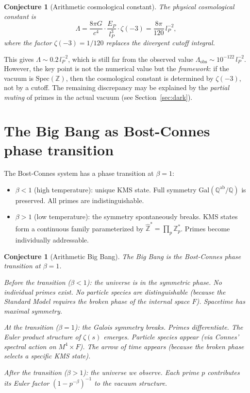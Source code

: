 \documentclass[11pt,a4paper]{article}
\newtheorem{conjecture}[theorem]{Conjecture}
\newcommand{\Spec}{\mathrm{Spec}}
\newcommand{\Zhat}{\hat{\mathbb{Z}}}
\begin{document}
\begin{conjecture}[Arithmetic cosmological constant]
\label{conj:cc}
The physical cosmological constant is
\begin{equation}
  \Lambda = \frac{8\pi G}{c^4} \cdot \frac{E_P}{l_P^3} \cdot \zeta(-3)
  = \frac{8\pi}{120}\,l_P^{-2},
\end{equation}
where the factor $\zeta(-3) = 1/120$ replaces the divergent
cutoff integral.
\end{conjecture}

This gives $\Lambda \sim 0.2\,l_P^{-2}$, which is still far
from the observed value $\Lambda_{\mathrm{obs}} \sim 10^{-122}\,l_P^{-2}$.
However, the key point is not the numerical value but the
\emph{framework}: if the vacuum is $\Spec(\mathbb{Z})$, then
the cosmological constant is determined by $\zeta(-3)$, not by
a cutoff. The remaining discrepancy may be explained by
the \emph{partial muting} of primes in the actual vacuum
(see Section~\ref{sec:dark}).

\section{The Big Bang as Bost-Connes phase transition}
\label{sec:bigbang}

The Bost-Connes system has a phase transition at $\beta = 1$:

\begin{itemize}
\item $\beta < 1$ (high temperature): unique KMS state.
  Full symmetry $\mathrm{Gal}(\mathbb{Q}^{\mathrm{ab}}/\mathbb{Q})$
  is preserved. All primes are indistinguishable.
\item $\beta > 1$ (low temperature): the symmetry spontaneously
  breaks. KMS states form a continuous family parameterized by
  $\Zhat^* = \prod_p \mathbb{Z}_p^*$. Primes become individually
  addressable.
\end{itemize}

\begin{conjecture}[Arithmetic Big Bang]
\label{conj:bigbang}
The Big Bang is the Bost-Connes phase transition at $\beta = 1$.

Before the transition ($\beta < 1$): the universe is in the
symmetric phase. No individual primes exist. No particle species
are distinguishable (because the Standard Model requires
the broken phase of the internal space $F$).
Spacetime has maximal symmetry.

At the transition ($\beta = 1$): the Galois symmetry breaks.
Primes differentiate. The Euler product structure of $\zeta(s)$
emerges. Particle species appear (via Connes' spectral action
on $M^4 \times F$). The arrow of time appears (because the
broken phase selects a specific KMS state).

After the transition ($\beta > 1$): the universe we observe.
Each prime $p$ contributes its Euler factor $(1-p^{-\beta})^{-1}$
to the vacuum structure.
\end{conjecture}
\end{document}
